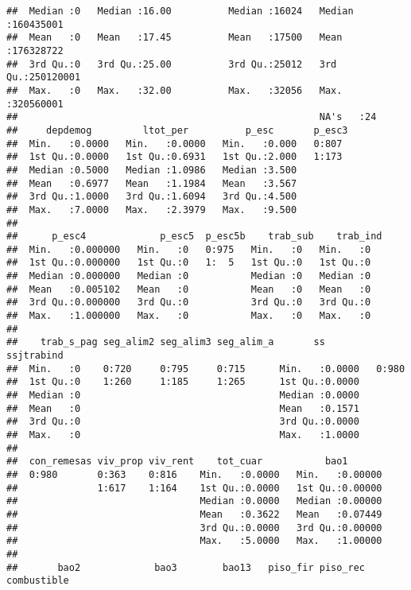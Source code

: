 \documentclass[11pt,]{article}
\begin{document}
\begin{verbatim}
##  Median :0   Median :16.00          Median :16024   Median :160435001  
##  Mean   :0   Mean   :17.45          Mean   :17500   Mean   :176328722  
##  3rd Qu.:0   3rd Qu.:25.00          3rd Qu.:25012   3rd Qu.:250120001  
##  Max.   :0   Max.   :32.00          Max.   :32056   Max.   :320560001  
##                                                     NA's   :24         
##     depdemog         ltot_per          p_esc       p_esc3 
##  Min.   :0.0000   Min.   :0.0000   Min.   :0.000   0:807  
##  1st Qu.:0.0000   1st Qu.:0.6931   1st Qu.:2.000   1:173  
##  Median :0.5000   Median :1.0986   Median :3.500          
##  Mean   :0.6977   Mean   :1.1984   Mean   :3.567          
##  3rd Qu.:1.0000   3rd Qu.:1.6094   3rd Qu.:4.500          
##  Max.   :7.0000   Max.   :2.3979   Max.   :9.500          
##                                                           
##      p_esc4             p_esc5  p_esc5b    trab_sub    trab_ind
##  Min.   :0.000000   Min.   :0   0:975   Min.   :0   Min.   :0  
##  1st Qu.:0.000000   1st Qu.:0   1:  5   1st Qu.:0   1st Qu.:0  
##  Median :0.000000   Median :0           Median :0   Median :0  
##  Mean   :0.005102   Mean   :0           Mean   :0   Mean   :0  
##  3rd Qu.:0.000000   3rd Qu.:0           3rd Qu.:0   3rd Qu.:0  
##  Max.   :1.000000   Max.   :0           Max.   :0   Max.   :0  
##                                                                
##    trab_s_pag seg_alim2 seg_alim3 seg_alim_a       ss         ssjtrabind
##  Min.   :0    0:720     0:795     0:715      Min.   :0.0000   0:980     
##  1st Qu.:0    1:260     1:185     1:265      1st Qu.:0.0000             
##  Median :0                                   Median :0.0000             
##  Mean   :0                                   Mean   :0.1571             
##  3rd Qu.:0                                   3rd Qu.:0.0000             
##  Max.   :0                                   Max.   :1.0000             
##                                                                         
##  con_remesas viv_prop viv_rent    tot_cuar           bao1        
##  0:980       0:363    0:816    Min.   :0.0000   Min.   :0.00000  
##              1:617    1:164    1st Qu.:0.0000   1st Qu.:0.00000  
##                                Median :0.0000   Median :0.00000  
##                                Mean   :0.3622   Mean   :0.07449  
##                                3rd Qu.:0.0000   3rd Qu.:0.00000  
##                                Max.   :5.0000   Max.   :1.00000  
##                                                                  
##       bao2             bao3        bao13   piso_fir piso_rec combustible

\end{verbatim}
\end{document}
